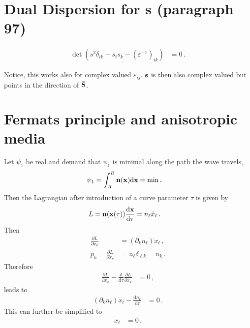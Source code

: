 \documentclass[a4paper,12pt]{article}
\newcommand{\vct}[1]{{\bf #1}}
\begin{document}
\section{Dual Dispersion for s (paragraph 97)}

\begin{align}
 \det(s^2 \delta_{ik} - s_i s_k - (\varepsilon^{-1})_{ik}) &= 0\,.
\end{align}

Notice, this works also for complex valued $\varepsilon_{ij}$. $\vct{s}$ is then also complex valued
but points in the direction of $\bar{\vct{S}}$.

\section{Fermats principle and anisotropic media}

Let $\psi_1$ be real and demand that $\psi_1$ is minimal along the path the wave travels,
\begin{align}
 \psi_1 &= \int_A^B \vct{n}(\vct{x}) \text{d} \vct{x} = \text{min}\,.
\end{align}
Then the Lagrangian after introduction of a curve parameter $\tau$ is given by
\begin{align}
 L &= \vct{n}(\vct{x}(\tau)) \frac{\text{d}\vct{x}}{\text{d}\tau} = n_\ell \dot{x}_\ell\,.
\end{align}
Then
\begin{align}
 \frac{\partial L}{\partial x_k} &= (\partial_k n_\ell) \dot{x}_\ell\,,\\
 p_k = \frac{\partial L}{\partial \dot{x}_k} &= n_\ell \delta_{\ell k} = n_k\,. 
\end{align}
Therefore
\begin{align}
 \frac{\partial L}{\partial x_k} - \frac{\text{d}}{\text{d}\tau}\frac{\partial L}{\partial \dot{x}_k} &= 0\,,
\end{align}
leads to
\begin{align}
 (\partial_k n_\ell) \dot{x}_\ell - \frac{\text{d} n_k}{\text{d} \tau} &= 0\,.
\end{align}
This can further be simplified to
\begin{align}
 [(\partial_k n_\ell) - (\partial_\ell n_k)] \dot{x}_\ell &= 0\,.
\end{align}
\end{document}
